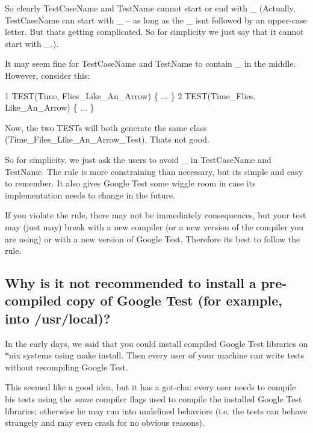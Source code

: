 So clearly {\ttfamily Test\+Case\+Name} and {\ttfamily Test\+Name} cannot start or end with {\ttfamily \+\_\+} (Actually, {\ttfamily Test\+Case\+Name} can start with {\ttfamily \+\_\+} -- as long as the {\ttfamily \+\_\+} isn\textquotesingle{}t followed by an upper-\/case letter. But that\textquotesingle{}s getting complicated. So for simplicity we just say that it cannot start with {\ttfamily \+\_\+}.).

It may seem fine for {\ttfamily Test\+Case\+Name} and {\ttfamily Test\+Name} to contain {\ttfamily \+\_\+} in the middle. However, consider this\+: 
\begin{DoxyCode}
1 TEST(Time, Flies\_Like\_An\_Arrow) \{ ... \}
2 TEST(Time\_Flies, Like\_An\_Arrow) \{ ... \}
\end{DoxyCode}


Now, the two {\ttfamily T\+E\+ST}s will both generate the same class ({\ttfamily Time\+\_\+\+Files\+\_\+\+Like\+\_\+\+An\+\_\+\+Arrow\+\_\+\+Test}). That\textquotesingle{}s not good.

So for simplicity, we just ask the users to avoid {\ttfamily \+\_\+} in {\ttfamily Test\+Case\+Name} and {\ttfamily Test\+Name}. The rule is more constraining than necessary, but it\textquotesingle{}s simple and easy to remember. It also gives Google Test some wiggle room in case its implementation needs to change in the future.

If you violate the rule, there may not be immediately consequences, but your test may (just may) break with a new compiler (or a new version of the compiler you are using) or with a new version of Google Test. Therefore it\textquotesingle{}s best to follow the rule.

\subsection*{Why is it not recommended to install a pre-\/compiled copy of Google Test (for example, into /usr/local)?}

In the early days, we said that you could install compiled Google Test libraries on {\ttfamily $\ast$}nix systems using {\ttfamily make install}. Then every user of your machine can write tests without recompiling Google Test.

This seemed like a good idea, but it has a got-\/cha\+: every user needs to compile his tests using the {\itshape same} compiler flags used to compile the installed Google Test libraries; otherwise he may run into undefined behaviors (i.\+e. the tests can behave strangely and may even crash for no obvious reasons).

